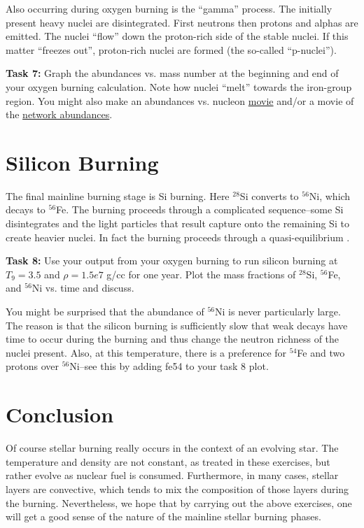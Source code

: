 \documentclass[manuscript]{aastex62}
\begin{document}
Also occurring during oxygen burning is the ``gamma'' process.  The initially
present heavy nuclei are disintegrated.  First neutrons then protons and
alphas are emitted.  The nuclei ``flow'' down the proton-rich side of the
stable nuclei.  If this matter ``freezes out'', proton-rich nuclei are
formed (the so-called ``p-nuclei'').

{\bf Task 7:}  Graph the abundances vs. mass number at the beginning and end of
your oxygen burning calculation.  Note how nuclei ``melt'' towards the
iron-group region.  You might also make an abundances vs. nucleon
\href{https://wnutils.readthedocs.io/en/latest/animate_tutorial.html#animating-the-abundances-versus-nucleon-number}{movie} and/or a movie of the
\href{https://wnutils.readthedocs.io/en/latest/animate_tutorial.html#animating-the-network-abundances}{network abundances}.

\section{Silicon Burning} \label{sec:Si}

The final mainline burning stage is Si burning.  Here $^{28}$Si converts to
$^{56}$Ni, which decays to $^{56}$Fe.  The burning proceeds through a
complicated sequence--some Si disintegrates and the light particles that result
capture onto the remaining Si to create heavier nuclei.  In fact the
burning proceeds through a quasi-equilibrium
\cite{1968ApJS...16..299B,1998ApJ...498..808M}.

{\bf Task 8:}  Use your output from your oxygen burning to run silicon burning
at $T_9 = 3.5$ and $\rho = 1.5e7$ g/cc for one year.
Plot the mass fractions of
$^{28}$Si, $^{56}$Fe, and $^{56}$Ni vs. time and discuss.

You might be surprised that the abundance of $^{56}$Ni is never particularly
large.  The reason is that the silicon burning is sufficiently slow that
weak decays have time to occur during the burning and thus change the
neutron richness of the nuclei present.  Also, at this temperature, there
is a preference for $^{54}$Fe and two protons over $^{56}$Ni--see this by
adding fe54 to your task 8 plot.

\section{Conclusion}

Of course stellar burning really occurs in the context of an evolving star.
The temperature and density are not constant, as treated in these exercises,
but rather evolve as nuclear fuel is consumed.  Furthermore, in many cases,
stellar layers are convective, which tends to mix the composition of those
layers during the burning.  
Nevertheless, we hope that by
carrying out the above exercises, one will get a good sense of the
nature of the mainline stellar burning phases.
\end{document}
